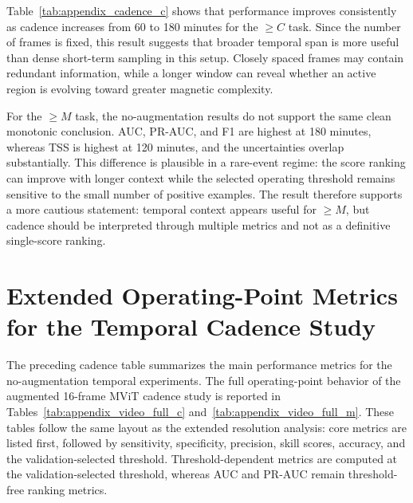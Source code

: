 \FloatBarrier

Table~\ref{tab:appendix_cadence_c} shows that performance improves consistently as cadence increases from 60 to 180 minutes for the $\geq C$ task. Since the number of frames is fixed, this result suggests that broader temporal span is more useful than dense short-term sampling in this setup. Closely spaced frames may contain redundant information, while a longer window can reveal whether an active region is evolving toward greater magnetic complexity.

For the $\geq M$ task, the no-augmentation results do not support the same clean monotonic conclusion. AUC, PR-AUC, and F1 are highest at 180 minutes, whereas TSS is highest at 120 minutes, and the uncertainties overlap substantially. This difference is plausible in a rare-event regime: the score ranking can improve with longer context while the selected operating threshold remains sensitive to the small number of positive examples. The result therefore supports a more cautious statement: temporal context appears useful for $\geq M$, but cadence should be interpreted through multiple metrics and not as a definitive single-score ranking.

\FloatBarrier

\section{Extended Operating-Point Metrics for the Temporal Cadence Study}
\label{app:extended_temporal_metrics}

The preceding cadence table summarizes the main performance metrics for the no-augmentation temporal experiments. The full operating-point behavior of the augmented 16-frame MViT cadence study is reported in Tables~\ref{tab:appendix_video_full_c} and~\ref{tab:appendix_video_full_m}. These tables follow the same layout as the extended resolution analysis: core metrics are listed first, followed by sensitivity, specificity, precision, skill scores, accuracy, and the validation-selected threshold. Threshold-dependent metrics are computed at the validation-selected threshold, whereas AUC and PR-AUC remain threshold-free ranking metrics.

